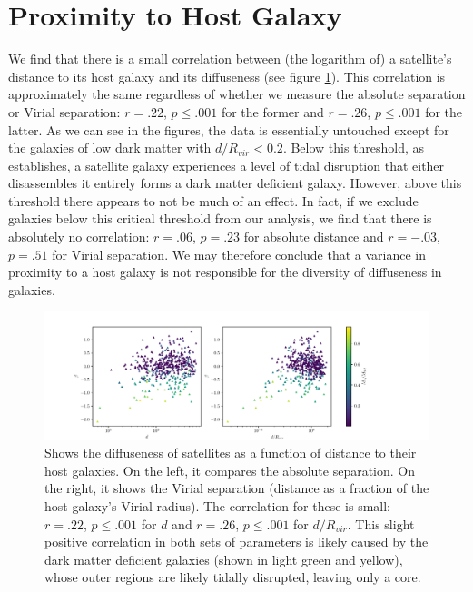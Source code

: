 \section{Proximity to Host Galaxy}
We find that there is a small correlation between (the logarithm of) a satellite's distance to its host galaxy and its diffuseness (see figure \ref{fig:beta-d}). This correlation is approximately the same regardless of whether we measure the absolute separation or Virial separation: $r = .22$, $p \leq .001$ for the former and $r = .26$, $p \leq .001$ for the latter. As we can see in the figures, the data is essentially untouched except for the galaxies of low dark matter with $d / R_{vir} < 0.2$. Below this threshold, as \cite{morenoGalaxiesLackingDark2022} establishes, a satellite galaxy experiences a level of tidal disruption that either disassembles it entirely forms a dark matter deficient galaxy. However, above this threshold there appears to not be much of an effect. In fact, if we exclude galaxies below this critical threshold from our analysis, we find that there is absolutely no correlation: $r = .06$, $p = .23$ for absolute distance and $r = -.03$, $p = .51$ for Virial separation. We may therefore conclude that a variance in proximity to a host galaxy is not responsible for the diversity of diffuseness in galaxies.

\begin{figure}
    \centering
    \includegraphics*[width=\textwidth*11/10]{figs/me/beta-d.pdf}
    \caption{
        Shows the diffuseness of satellites as a function of distance to their host galaxies. On the left, it compares the absolute separation. On the right, it shows the Virial separation (distance as a fraction of the host galaxy's Virial radius). The correlation for these is small: $r = .22$, $p \leq .001$ for $d$ and $r = .26$, $p \leq .001$ for $d / R_{vir}$. This slight positive correlation in both sets of parameters is likely caused by the dark matter deficient galaxies (shown in light green and yellow), whose outer regions are likely tidally disrupted, leaving only a core.
    }
    \label{fig:beta-d}
\end{figure}


